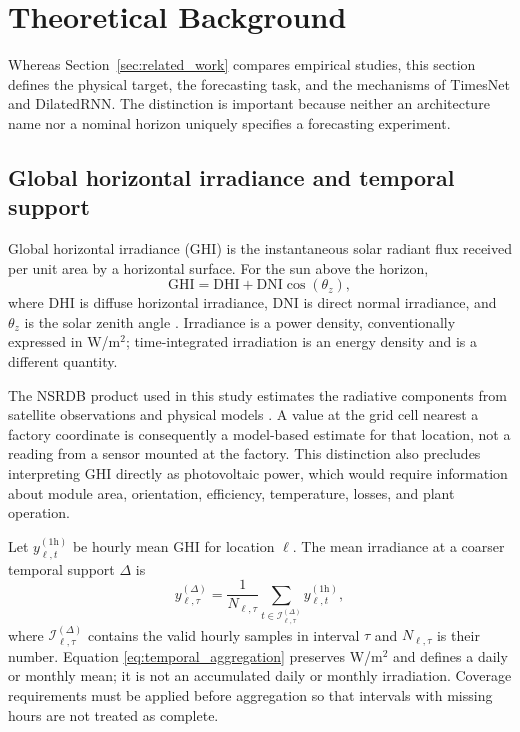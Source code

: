 \section{Theoretical Background}
\label{sec:background}

Whereas Section~\ref{sec:related_work} compares empirical studies, this section
defines the physical target, the forecasting task, and the mechanisms of
TimesNet and DilatedRNN. The distinction is important because neither an
architecture name nor a nominal horizon uniquely specifies a forecasting
experiment.

\subsection{Global horizontal irradiance and temporal support}

Global horizontal irradiance (GHI) is the instantaneous solar radiant flux
received per unit area by a horizontal surface. For the sun above the horizon,
\begin{equation}
  \mathrm{GHI}
  =
  \mathrm{DHI}
  +
  \mathrm{DNI}\cos(\theta_z),
  \label{eq:ghi}
\end{equation}
where DHI is diffuse horizontal irradiance, DNI is direct normal irradiance,
and $\theta_z$ is the solar zenith angle \cite{duffie2013}. Irradiance is a
power density, conventionally expressed in W/m$^2$; time-integrated irradiation
is an energy density and is a different quantity.

The NSRDB product used in this study estimates the radiative components from
satellite observations and physical models \cite{sengupta2018}. A value at the
grid cell nearest a factory coordinate is consequently a model-based estimate
for that location, not a reading from a sensor mounted at the factory. This
distinction also precludes interpreting GHI directly as photovoltaic power,
which would require information about module area, orientation, efficiency,
temperature, losses, and plant operation.

Let $y_{\ell,t}^{(1\mathrm{h})}$ be hourly mean GHI for location $\ell$. The
mean irradiance at a coarser temporal support $\Delta$ is
\begin{equation}
  y_{\ell,\tau}^{(\Delta)}
  =
  \frac{1}{N_{\ell,\tau}}
  \sum_{t\in\mathcal{I}_{\ell,\tau}^{(\Delta)}}
  y_{\ell,t}^{(1\mathrm{h})},
  \label{eq:temporal_aggregation}
\end{equation}
where $\mathcal{I}_{\ell,\tau}^{(\Delta)}$ contains the valid hourly samples in
interval $\tau$ and $N_{\ell,\tau}$ is their number. Equation
\eqref{eq:temporal_aggregation} preserves W/m$^2$ and defines a daily or
monthly mean; it is not an accumulated daily or monthly irradiation. Coverage
requirements must be applied before aggregation so that intervals with missing
hours are not treated as complete.

